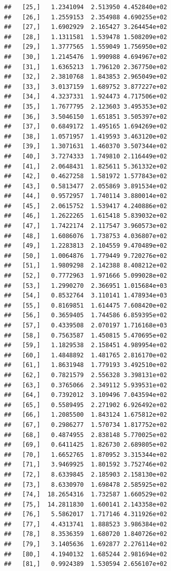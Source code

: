 \documentclass[article]{jss}\usepackage[]{graphicx}\usepackage[]{xcolor}
\makeatletter
\newenvironment{kframe}{%
 \def\at@end@of@kframe{}%
 \ifinner\ifhmode%
  \def\at@end@of@kframe{\end{minipage}}%
  \begin{minipage}{\columnwidth}%
 \fi\fi%
 \def\FrameCommand##1{\hskip\@totalleftmargin \hskip-\fboxsep
 \colorbox{shadecolor}{##1}\hskip-\fboxsep
     \hskip-\linewidth \hskip-\@totalleftmargin \hskip\columnwidth}%
 \MakeFramed {\advance\hsize-\width
   \@totalleftmargin\z@ \linewidth\hsize
   \@setminipage}}%
 {\par\unskip\endMakeFramed%
 \at@end@of@kframe}
\newenvironment{knitrout}{}{} %
\makeatother
\begin{document}
\begin{knitrout}
\begin{kframe}
\begin{verbatim}
##   [25,]   1.2341094  2.513950 4.452840e+02
##   [26,]   1.2559153  2.354988 4.690255e+02
##   [27,]   1.6902929  2.165427 3.264454e+02
##   [28,]   1.1311581  1.539478 1.508209e+02
##   [29,]   1.3777565  1.559049 1.756950e+02
##   [30,]   1.2145476  1.990988 4.694967e+02
##   [31,]   1.6365213  1.796120 2.367750e+02
##   [32,]   2.3810768  1.843853 2.965049e+02
##   [33,]   3.0137159  1.689752 3.877227e+02
##   [34,]   4.3237331  1.924473 4.717506e+02
##   [35,]   1.7677795  2.123603 3.495353e+02
##   [36,]   3.5046150  1.651851 3.505397e+02
##   [37,]   0.6849172  1.495165 1.694269e+02
##   [38,]   1.0571957  1.419593 3.463120e+02
##   [39,]   1.3071631  1.460370 3.507344e+02
##   [40,]   3.7274333  1.749810 2.116449e+02
##   [41,]   2.0648431  1.825611 5.361332e+02
##   [42,]   0.4627258  1.581972 1.577843e+02
##   [43,]   0.5813477  2.055869 3.891534e+02
##   [44,]   0.9572957  1.740114 3.880014e+02
##   [45,]   2.0615752  1.539417 4.240886e+02
##   [46,]   1.2622265  1.615418 5.839032e+02
##   [47,]   1.7422174  2.117547 3.960573e+02
##   [48,]   1.6086076  1.738753 4.036807e+02
##   [49,]   1.2283813  2.104559 9.470489e+02
##   [50,]   1.0064876  1.779449 9.720276e+02
##   [51,]   1.9809298  2.142388 8.408212e+02
##   [52,]   0.7772963  1.971666 5.099028e+02
##   [53,]   1.2990270  2.366951 1.015684e+03
##   [54,]   0.8532764  3.110141 1.478934e+03
##   [55,]   0.8169851  1.614475 7.608420e+02
##   [56,]   0.3659405  1.744586 6.859395e+02
##   [57,]   0.4339508  2.070197 1.716168e+03
##   [58,]   0.7563587  1.450815 5.470695e+02
##   [59,]   1.1829538  2.158451 4.989954e+02
##   [60,]   1.4848892  1.481765 2.816170e+02
##   [61,]   1.8631948  1.779193 3.492510e+02
##   [62,]   0.7821579  2.556328 3.398131e+02
##   [63,]   0.3765066  2.349112 5.939531e+02
##   [64,]   0.7392012  3.109496 7.043594e+02
##   [65,]   0.5589495  2.271902 6.926492e+02
##   [66,]   1.2085500  1.843124 1.675812e+02
##   [67,]   0.2986277  1.570734 1.817752e+02
##   [68,]   0.4874955  2.838148 5.770025e+02
##   [69,]   0.6411425  1.826730 2.689805e+02
##   [70,]   1.6652765  1.870952 3.315344e+02
##   [71,]   3.9469925  1.801592 3.752746e+02
##   [72,]   8.6339845  2.185903 2.158130e+02
##   [73,]   8.6330970  1.698478 2.585925e+02
##   [74,]  18.2654316  1.732587 1.660529e+02
##   [75,]  14.2811830  1.600141 2.143358e+02
##   [76,]   5.5862017  1.717146 4.311926e+02
##   [77,]   4.4313741  1.888523 3.986384e+02
##   [78,]   8.3536359  1.680720 1.840726e+02
##   [79,]   3.1405636  1.692877 2.276114e+02
##   [80,]   4.1940132  1.685244 2.981694e+02
##   [81,]   0.9924389  1.530594 2.656107e+02

\end{verbatim}
\end{kframe}
\end{knitrout}
\end{document}
